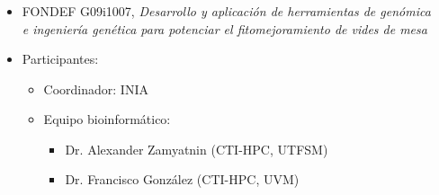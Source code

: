 \frame
{
\frametitle{}

\begin{columns}
\begin{itemize}
\item FONDEF G09i1007,  \emph{Desarrollo y aplicaci\'{o}n de herramientas de gen\'{o}mica e ingenier\'{i}a gen\'{e}tica para potenciar el fitomejoramiento de vides de mesa}
\item Participantes:
	\begin{itemize}
	\item Coordinador: INIA
	\item Equipo bioinform\'{a}tico: 
		\begin{itemize}
		\item Dr. Alexander Zamyatnin (CTI-HPC, UTFSM)
		\item Dr. Francisco González (CTI-HPC, UVM)
		\end{itemize}
	\end{itemize}
\end{itemize}
\begin{center}
\end{center}
\end{columns}
}

